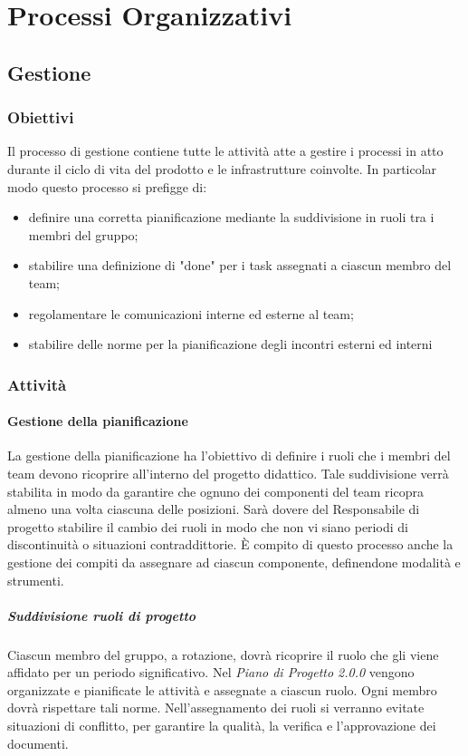 \section{Processi Organizzativi}
	\subsection{Gestione}
	\subsubsection{Obiettivi}
	Il processo di gestione contiene tutte le attività atte a gestire i processi in atto durante il ciclo di vita del prodotto e le infrastrutture coinvolte.
	In particolar modo questo processo si prefigge di:
	\begin{itemize}
		\item definire una corretta pianificazione mediante la suddivisione in ruoli tra i membri del gruppo;
		\item stabilire una definizione di "done" per i task assegnati a ciascun membro del team;
		\item regolamentare le comunicazioni interne ed esterne al team;
		\item stabilire delle norme per la pianificazione degli incontri esterni ed interni
	\end{itemize}
	
	\subsubsection{Attività}
	\paragraph{Gestione della pianificazione}
	La gestione della pianificazione ha l'obiettivo di definire i ruoli che i membri del team devono ricoprire all'interno del progetto didattico. Tale suddivisione verrà stabilita in modo da garantire che ognuno dei componenti del team ricopra almeno una volta ciascuna delle posizioni. Sarà dovere del Responsabile di progetto stabilire il cambio dei ruoli in modo che non vi siano periodi di discontinuità o situazioni contraddittorie. È compito di questo processo anche la gestione dei compiti da assegnare ad ciascun componente, definendone modalità e strumenti.
	
   		\subparagraph*{Suddivisione ruoli di progetto}
   			Ciascun membro del gruppo, a rotazione, dovrà ricoprire il ruolo che gli viene affidato per un periodo significativo. Nel \textit{Piano di Progetto 2.0.0\docs} vengono organizzate e pianificate le attività e assegnate a ciascun ruolo. Ogni membro dovrà rispettare tali norme.
   			Nell'assegnamento dei ruoli si verranno evitate situazioni di conflitto, per garantire la qualità, la verifica e l'approvazione dei documenti.

